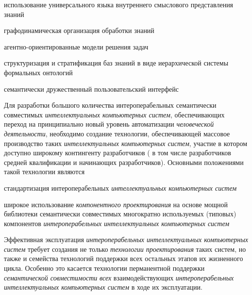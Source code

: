 \begin{textitemize}
\begin{textitemize}
		\item использование универсального языка внутреннего смыслового представления знаний
		\item графодинамическая организация обработки знаний
		\item агентно-ориентированные модели решения задач
		\item структуризация и стратификация баз знаний в виде иерархической системы формальных онтологий
		\item семантически дружественный пользовательский интерфейс
	\end{textitemize}
	\item Для разработки большого количества интероперабельных семантически совместимых \textit{интеллектуальных компьютерных систем}, обеспечивающих переход на принципиально новый уровень автоматизации \textit{человеческой деятельности}, необходимо создание технологии, обеспечивающей массовое производство таких \textit{интеллектуальных компьютерных систем}, участие в котором доступно широкому контингенту разработчиков ( в том числе разработчиков средней квалификации и начинающих разработчиков). Основными положениями такой технологии являются
	\begin{textitemize}
		\item стандартизация интероперабельных \textit{интеллектуальных компьютерных систем}
		\item широкое использование \textit{компонентного проектирования} на основе мощной библиотеки семантически совместимых многократно используемых (типовых) компонентов \textit{интероперабельных интеллектуальных компьютерных систем}
	\end{textitemize}
	\item Эффективная эксплуатация \textit{интероперабельных интеллектуальных компьютерных систем} требует создания не только \textit{технологии проектирования} таких систем, но также и семейства технологий поддержки всех остальных этапов их жизненного цикла. Особенно это касается технологии перманентной поддержки \textit{семантической совместимости} \textit{всех} взаимодействующих \textit{интероперабельных интеллектуальных компьютерных систем} в ходе их эксплуатации.
\end{textitemize}

%